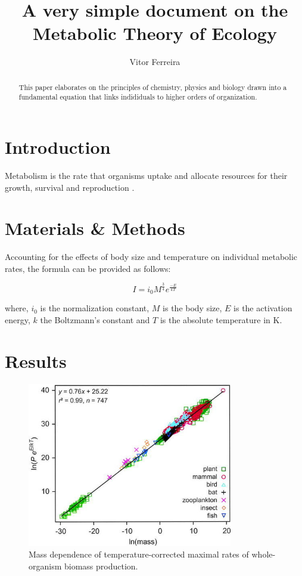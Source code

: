 \documentclass[12pt]{article}
\title{A very simple document on the Metabolic Theory of Ecology}
\author{Vitor Ferreira}
\date{}
\begin{document}
  \maketitle
  
  \begin{abstract}

    This paper elaborates on the principles of chemistry, physics and biology drawn into a fundamental equation that links indididuals to higher orders of organization.
  \end{abstract}
  
  \section{Introduction}

    Metabolism is the rate that organisms uptake and allocate resources for their growth, survival and reproduction \cite{brown2004toward}.

  \section{Materials \& Methods}

    Accounting for the effects of body size and temperature on individual metabolic rates, the formula can be provided as follows:
  
  \begin{equation}
    I = i_0 M^\frac{3}{4} e^\frac{-E}{kT}
  \end{equation}

    where, $i_0$ is the normalization constant, $M$ is the body size, $E$ is the activation energy, $k$ the Boltzmann's constant and $T$ is the absolute temperature in K.


  \section{Results}

    \begin{figure}[H]
      \begin{center}
      \includegraphics[width=0.8\textwidth]{../data/mass_dependence_temp.jpg}
      \caption{Mass dependence of temperature-corrected maximal rates of whole-organism biomass production.}
      \label{fig:mass_dep_temp}
      \end{center}
    \end{figure}
\end{document}
